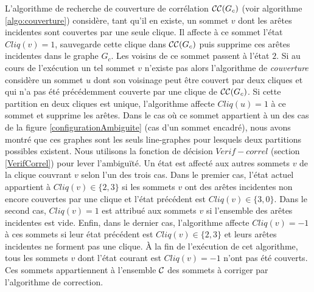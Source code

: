 \FloatBarrier
L'algorithme de recherche de couverture de corr\'elation ${\cal CC}(G_c)$ (voir algorithme \ref{algo:couverture})  consid\`ere, tant qu'il en existe, un sommet $v$ dont les ar\^etes incidentes sont couvertes par une seule clique. 
Il affecte \`a ce sommet l'\'etat $Cliq(v) = 1$, sauvegarde cette clique dans ${\cal CC}(G_c)$ puis supprime ces ar\^etes incidentes dans le graphe $G_c$. Les voisins de ce sommet passent \`a l'\'etat $2$.
\newline
Si au cours de l'ex\'ecution un tel sommet $v$ n'existe pas alors l'algorithme de {\em couverture} consid\`ere un sommet $u$ dont son voisinage peut \^etre couvert par deux cliques et qui n'a pas \'et\'e pr\'ec\'edemment couverte par une clique de ${\cal CC}(G_c)$. 
Si cette partition en deux cliques est unique, l'algorithme affecte $Cliq(u) = 1$ \`a ce sommet et supprime les ar\^etes. 
Dans le cas o\`u ce sommet appartient \`a un des cas de la figure \ref{configurationAmbiguite} (cas d'un sommet encadr\'e), nous avons montr\'e que ces graphes sont les seuls line-graphes pour lesquels deux partitions possibles existent. 
Nous utilisons la fonction de d\'ecision  $Verif-correl$  (section \ref{VerifCorrel}) pour lever l'ambigu\"{i}t\'e.
\newline
Un \'etat est affect\'e aux autres sommets $v$ de la clique couvrant $v$ selon l'un des trois cas. 
Dans le premier cas, l'\'etat actuel appartient \`a $Cliq(v) \in \{2,3\}$ si les sommets $v$ ont des ar\^etes incidentes non encore couvertes par une clique et l'\'etat pr\'ec\'edent est $Cliq(v) \in \{ 3,0\}$. 
Dans le second cas, $Cliq(v) = 1$ est attribu\'e aux sommets $v$ si l'ensemble des ar\^etes incidentes est vide. 
Enfin, dans le dernier cas, l'algorithme  affecte $Cliq(v) = -1$ \`a ces sommets si leur \'etat pr\'ec\'edent est  $Cliq(v) \in \{2,3\}$ et leurs ar\^etes incidentes ne forment pas une clique.
\newline
\`A la fin  de l'ex\'ecution de cet algorithme, tous les sommets $v$ dont l'\'etat courant est $Cliq(v) = -1$  n'ont pas \'et\'e couverts. 
Ces sommets appartiennent \`a l'ensemble $\cal C$ des sommets \`a corriger par l'algorithme de correction.
\newline

